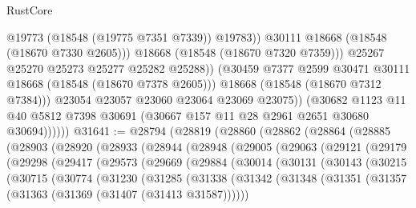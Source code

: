 \begin{lexlean}{RustCore}
\begin{coremodule}
                              @19773
                              (@18548 (@19775 @7351 @7339))
                              @19783))
                          @30111
                          @18668
                          (@18548 (@18670 @7330 @2605)))
                        @18668
                        (@18548 (@18670 @7320 @7359)))
                      @25267
                      @25270
                      @25273
                      @25277
                      @25282
                      @25288))
                  (@30459 @7377 @2599 @30471 @30111 @18668 (@18548 (@18670 @7378 @2605)))
                  @18668
                  (@18548 (@18670 @7312 @7384)))
                @23054
                @23057
                @23060
                @23064
                @23069
                @23075))
            (@30682
              @1123
              @11
              @40
              @5812
              @7398
              @30691
              (@30667 @157 @11 @28 @2961 @2651 @30680 @30694))))))
@31641 := @28794
    (@28819
      (@28860
        (@28862
          (@28864
            (@28885
              (@28903
                (@28920
                  (@28933
                    (@28944
                      (@28948
                        (@29005
                          (@29063
                            (@29121
                              (@29179
                                (@29298
                                  (@29417
                                    (@29573
                                      (@29669
                                        (@29884
                                          (@30014
                                            (@30131
                                              (@30143
                                                (@30215
                                                  (@30715
                                                    (@30774
                                                      (@31230
                                                        (@31285
                                                          (@31338
                                                            (@31342
                                                              (@31348
                                                                (@31351
                                                                  (@31357
                                                                    (@31363
                                                                      (@31369
                                                                        (@31407 (@31413 @31587))))))

\end{coremodule}
\end{lexlean}
